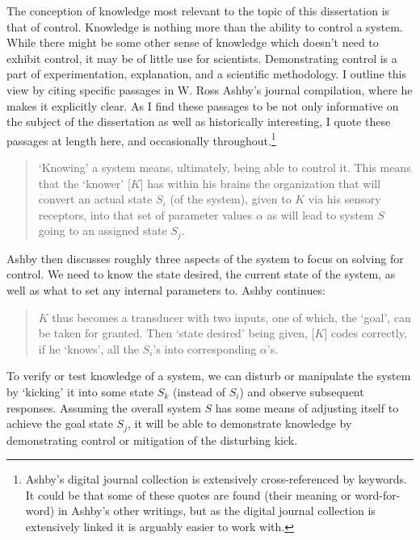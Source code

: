 \documentclass[11pt, oneside]{article}   	%
\begin{document}
The conception of knowledge most relevant to the topic of this dissertation is that of control.  Knowledge is nothing more than the ability to control a system.  While there might be some other sense of knowledge which doesn't need to exhibit control, it may be of little use for scientists.  Demonstrating control is a part of experimentation, explanation, and a scientific methodology.  I outline this view by citing specific passages in W. Ross Ashby's journal compilation, where he makes it explicitly clear.  As I find these passages to be not only informative on the subject of the dissertation as well as historically interesting, I quote these passages at length here, and occasionally throughout.\footnote{Ashby's digital journal collection is extensively cross-referenced by keywords.  It could be that some of these quotes are found (their meaning or word-for-word) in Ashby's other writings, but as the digital journal collection is extensively linked it is arguably easier to work with.}

\begin{quote}
`Knowing' a system means, ultimately, being able to control it.  This means that the `knower' [$K$] has within his brains the organization that will convert an actual state $S_i$ (of the system), given to $K$ via his sensory receptors, into that set of parameter values $\alpha$ as will lead to system $S$ going to an assigned state $S_j$. \cite[p. 4292]{AshbyJournal}
\end{quote}

Ashby then discusses roughly three aspects of the system to focus on solving for control.  We need to know the state desired, the current state of the system, as well as what to set any internal parameters to.  Ashby continues:

\begin{quote}
$K$ thus becomes a transducer with two inputs, one of which, the `goal', can be taken for granted.  Then `state desired' being given, [$K$] codes correctly, if he `knows', all the $S_i$'s into corresponding $\alpha$'s.  \cite[p. 4292]{AshbyJournal}
\end{quote}

To verify or test knowledge of a system, we can disturb or manipulate the system by `kicking' it into some state $S_k$ (instead of $S_i$) and observe subsequent responses.  Assuming the overall system $S$ has some means of adjusting itself to achieve the goal state $S_j$, it will be able to demonstrate knowledge by demonstrating control or mitigation of the disturbing kick.
\end{document}
